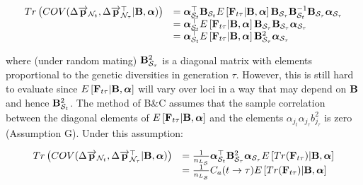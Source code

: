 \documentclass[12pt]{article}
\begin{document}
\begin{bibunit}
\begin{equation}
\begin{array}{rl}
Tr\left(COV(\Delta \overrightarrow{\bf p}_{{\mathcal N}_t}, \Delta \overrightarrow{\bf p}_{{\mathcal N}_{\tau}}^\top | {\bf B}, \boldsymbol{\alpha})\right)&=
\boldsymbol{\alpha}_{{\mathcal S}_t}^{\top}{\bf B}_{{\mathcal S}_t}E\left[{\bf F}_{t\tau} | {\bf B}, \boldsymbol{\alpha}\right]{\bf B}_{\mathcal{S}_\tau}{\bf B}_{\mathcal{S}_t}^{-1}{\bf B}_{{\mathcal S}_{\tau}}\boldsymbol{\alpha}_{{\mathcal S}_{\tau}}\\
&=
\boldsymbol{\alpha}_{{\mathcal S}_t}^{\top}E\left[{\bf F}_{t\tau} | {\bf B}, \boldsymbol{\alpha}\right]{\bf B}_{\mathcal{S}_\tau}{\bf B}_{{\mathcal S}_{\tau}}\boldsymbol{\alpha}_{{\mathcal S}_{\tau}}\\
&=
\boldsymbol{\alpha}_{{\mathcal S}_t}^{\top}E\left[{\bf F}_{t\tau} | {\bf B}, \boldsymbol{\alpha}\right]{\bf B}_{\mathcal{S}_\tau}^2\boldsymbol{\alpha}_{{\mathcal S}_{\tau}}\\
\end{array}
\label{Eq:BCcov9}
\end{equation}

where (under random mating) ${\bf B}_{\mathcal{S}_\tau}^2$ is a diagonal matrix with elements proportional to the genetic diversities in generation $\tau$. However, this is still hard to evaluate since $E\left[{\bf F}_{t\tau} | {\bf B}, \boldsymbol{\alpha}\right]$ will vary over loci in a way that may depend on ${\bf B}$ and hence ${\bf B}_{{\mathcal S}_t}^2$. 
The method of B\&C assumes that the sample correlation between the diagonal elements of $E\left[{\bf F}_{t\tau} | {\bf B},\boldsymbol{\alpha}\right]$ and the elements $\alpha_{j_t}\alpha_{j_\tau}b^2_{j_\tau}$ is zero (Assumption G). Under this assumption:

\begin{equation}
\begin{array}{rl}
Tr\left(COV(\Delta \overrightarrow{\bf p}_{{\mathcal N}_t}, \Delta \overrightarrow{\bf p}_{{\mathcal N}_{\tau}}^\top | {\bf B}, \boldsymbol{\alpha}) \right)&=\frac{1}{n_{L_\mathcal{S}}}
\boldsymbol{\alpha}_{{\mathcal S}_{t}}^{\top}{\bf B}_{\mathcal{S}_\tau}^2\boldsymbol{\alpha}_{{\mathcal S}_{\tau}}E\left[Tr({\bf F}_{t\tau}) | {\bf B}, \boldsymbol{\alpha}\right]\\
&=
\frac{1}{n_{L_\mathcal{S}}}C_a(t\rightarrow\tau)E\left[Tr({\bf F}_{t\tau}) | {\bf B}, \boldsymbol{\alpha}\right]\\
\end{array}
\label{Eq:BCcov10}
\end{equation}


\end{bibunit}
\end{document}
